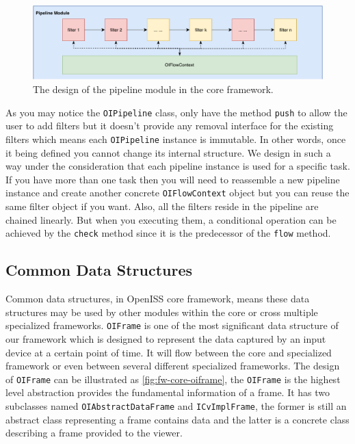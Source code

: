 \begin{figure}
    \includegraphics[width=\linewidth]{figures/framework_core_pipeline2.pdf}
    \caption{The design of the pipeline module in the core framework.}
    \label{fig:fw-core-pipeline}
\end{figure}

As you may notice the \texttt{OIPipeline} class, only have the method
\texttt{push} to allow the user to add filters but it doesn't provide any
removal interface for the existing filters which means each \texttt{OIPipeline}
instance is immutable. In other words, once it being defined you cannot change
its internal structure.
We design in such a way under the consideration that each pipeline instance is
used for a specific task. If you have more than one task then you will need to
reassemble a new pipeline instance and create another concrete
\texttt{OIFlowContext} object but you can reuse the same filter object if you
want. Also, all the filters reside in the pipeline are chained linearly. But
when you executing them, a conditional operation can be achieved by the
\texttt{check} method since it is the predecessor of the \texttt{flow} method.

\subsection{Common Data Structures}
\label{sec:fw-design-core-common-ds}

Common data structures, in OpenISS core framework, means these data structures
may be used by other modules within the core or cross multiple specialized
frameworks.
\texttt{OIFrame} is one of the most significant data structure of our
framework which is designed to represent the data captured by an input device
at a certain point of time. It will flow between the core and
specialized framework or even between several different specialized frameworks.
The design of \texttt{OIFrame} can be illustrated as
\autoref{fig:fw-core-oiframe}, the \texttt{OIFrame} is the highest level
abstraction provides the fundamental information of a frame. It has two
subclasses named \texttt{OIAbstractDataFrame} and \texttt{ICvImplFrame}, the
former is still an abstract class representing a frame contains data and the
latter is a concrete class describing a frame provided to the viewer.

